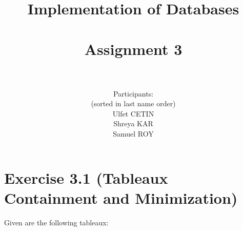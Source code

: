 \documentclass[10pt]{article}
\title{Implementation of Databases \\ ~~~ \\ Assignment 3 \\ ~~~ \\ }
\author{
	Participants:\\
	(sorted in last name order)\\
	Ulfet CETIN\\ 
	Shreya KAR\\
	Samuel ROY\\	
}
\date{}
\begin{document}
	\maketitle
	
	\clearpage
	
	\section*{Exercise 3.1 (Tableaux Containment and Minimization)}
	Given are the following tableaux:
	

			
		\begin{figure}[!htb]
			\centering
			\begin{minipage}[t]{0.2\textwidth}
				\begin{table}[H]
				\end{table}
			\end{minipage}
			\begin{minipage}[t]{0.2\textwidth}
				\begin{table}[H]
				\end{table}
			\end{minipage}
			\begin{minipage}[t]{0.2\textwidth}
				\begin{table}[H]
\end{table}
\end{minipage}
\end{figure}
\end{document}
